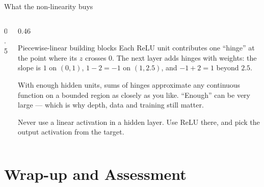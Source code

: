 \documentclass[aspectratio=169,10pt]{beamer}
\begin{document}
\begin{frame}{What the non-linearity buys}
  \begin{columns}[T,onlytextwidth]
    \begin{column}{0.5\textwidth}
      \par
    \end{column}
    \begin{column}{0.46\textwidth}
      \footnotesize
      \begin{block}{Piecewise-linear building blocks}
        Each ReLU unit contributes one ``hinge'' at the point where its $z$ crosses $0$.
        The next layer adds hinges with weights: the slope is $1$ on $(0,1)$, $1-2=-1$ on
        $(1,2.5)$, and $-1+2=1$ beyond $2.5$.
      \end{block}
      \begin{keyidea}
        With enough hidden units, sums of hinges approximate any continuous function on a
        bounded region as closely as you like. ``Enough'' can be very large --- which is
        why depth, data and training still matter.
      \end{keyidea}
      \begin{pitfall}
        \footnotesize Never use a linear activation in a hidden layer. Use ReLU there, and
        pick the output activation from the target.
      \end{pitfall}
    \end{column}
  \end{columns}
\end{frame}

\section{Wrap-up and Assessment}
\end{document}

